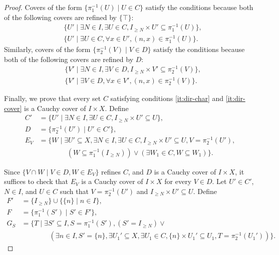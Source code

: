 \documentclass[reqno]{amsart}
\theoremstyle{definition}
\theoremstyle{remark}
\numberwithin{figure}{section}
\begin{document}
\begin{proof}
Covers of the form $\{ \pi_1^{-1}(U) \mid U \in C \}$ satisfy the conditions because both of the following covers are refined by $\{ \top \}$:
\begin{align*}
& \{ U' \mid \exists N \in I, \exists U \in C, I_{\geq N} \times U' \subseteq \pi_1^{-1}(U) \}, \\
& \{ U' \mid \exists U \in C, \forall x \in U', (n,x) \in \pi_1^{-1}(U) \}.
\end{align*}
Similarly, covers of the form $\{ \pi_2^{-1}(V) \mid V \in D \}$ satisfy the conditions because both of the following covers are refined by $D$:
\begin{align*}
& \{ V' \mid \exists N \in I, \exists V \in D, I_{\geq N} \times V' \subseteq \pi_2^{-1}(V) \}, \\
& \{ V' \mid \exists V \in D, \forall x \in V', (n,x) \in \pi_2^{-1}(V) \}.
\end{align*}

Finally, we prove that every set $C$ satisfying conditions \eqref{it:dir-char} and \eqref{it:dir-cover} is a Cauchy cover of $I \times X$.
Define
\begin{align*}
C' & = \{ U' \mid \exists N \in I, \exists U \in C, I_{\geq N} \times U' \subseteq U \}, \\
D & = \{ \pi_2^{-1}(U') \mid U' \in C' \}, \\
E_V & = \{ W \mid \exists U' \subseteq X, \exists N \in I, \exists U \in C, I_{\geq N} \times U' \subseteq U, V = \pi_2^{-1}(U'), \\
& \qquad \qquad (W \subseteq \pi_1^{-1}(I_{\geq N})) \lor (\exists W_1 \in C, W \subseteq W_1) \}.
\end{align*}

Since $\{ V \cap W \mid V \in D, W \in E_V \}$ refines $C$, and $D$ is a Cauchy cover of $I \times X$, it suffices to check that $E_V$ is a Cauchy cover of $I \times X$ for every $V \in D$.
Let $U' \in C'$, $N \in I$, and $U \in C$ such that $V = \pi_2^{-1}(U')$ and $I_{\geq N} \times U' \subseteq U$.
Define
\begin{align*}
F' & = \{ I_{\geq N} \} \cup \{ \{ n \} \mid n \in I \}, \\
F & = \{ \pi_1^{-1}(S') \mid S' \in F' \}, \\
G_S & = \{ T \mid \exists S' \subseteq I, S = \pi_1^{-1}(S'), (S' = I_{\geq N}) \lor \\
& \qquad \qquad (\exists n \in I, S' = \{ n \}, \exists U_1' \subseteq X, \exists U_1 \in C, \{ n \} \times U_1' \subseteq U_1, T = \pi_2^{-1}(U_1')) \}.
\end{align*}


\end{proof}
\end{document}
